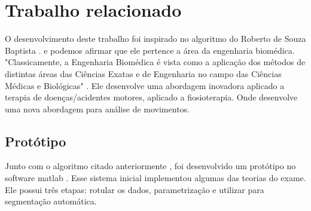   \section{Trabalho relacionado}
  \label{Sec:MetCondTCC}
    O desenvolvimento deste trabalho foi inspirado no algoritmo do Roberto de Souza Baptista \cite{roberto}.
  e podemos afirmar que ele pertence a área da engenharia biomédica. "Classicamente,
  a Engenharia Biomédica é vista como a aplicação dos métodos de distintas áreas
  das Ciências Exatas e de Engenharia no campo das Ciências Médicas e
  Biológicas" \cite{engenhariaBiomedica}. Ele desenvolve uma abordagem
  inovadora aplicado a terapia de  doenças/acidentes motores, aplicado a
   fiosioterapia. Onde desenvolve uma nova abordagem para análise de movimentos.

  \subsection{Protótipo}
  \label{Sec:protótipo}
    Junto com o algoritmo citado anteriormente \cite{roberto}, foi
  desenvolvido um protótipo no software matlab \cite{matlab}. Esse sistema inicial
  implementou algumas das teorias do exame. Ele possui três etapas: rotular os dados,
  parametrização e utilizar para segmentação automática.
